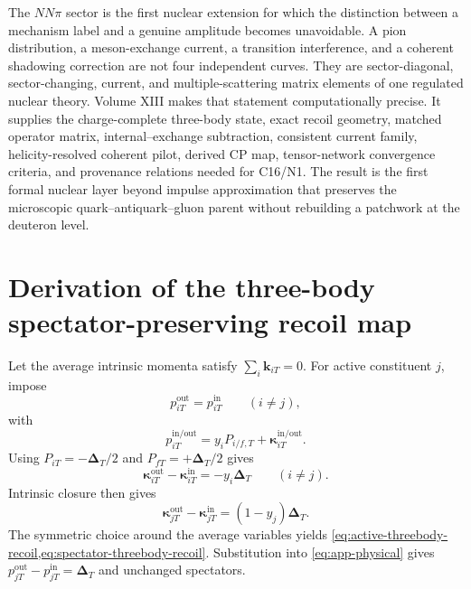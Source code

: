 \documentclass[11pt]{article}
\newcommand{\DT}{\bm{\Delta}_{T}}
\begin{document}
The \(NN\pi\) sector is the first nuclear extension for which the distinction
between a mechanism label and a genuine amplitude becomes unavoidable.  A
pion distribution, a meson-exchange current, a transition interference, and a
coherent shadowing correction are not four independent curves.  They are
sector-diagonal, sector-changing, current, and multiple-scattering matrix
elements of one regulated nuclear theory.  Volume XIII makes that statement
computationally precise.  It supplies the charge-complete three-body state,
exact recoil geometry, matched operator matrix, internal--exchange
subtraction, consistent current family, helicity-resolved coherent pilot,
derived CP map, tensor-network convergence criteria, and provenance relations
needed for C16/N1.  The result is the first formal nuclear layer beyond
impulse approximation that preserves the microscopic quark--antiquark--gluon
parent without rebuilding a patchwork at the deuteron level.

\appendix

\section{Derivation of the three-body spectator-preserving recoil map}
\label{app:recoil}

Let the average intrinsic momenta satisfy
\(
\sum_i\bm k_{iT}=0
\).
For active constituent \(j\), impose
\begin{equation}
 p_{iT}^{\mathrm{out}}=p_{iT}^{\mathrm{in}}
 \qquad(i\neq j),
 \label{eq:app-spectator}
\end{equation}
with
\begin{equation}
 p_{iT}^{\mathrm{in/out}}
 =y_iP_{i/f,T}+\bm\kappa_{iT}^{\mathrm{in/out}}.
 \label{eq:app-physical}
\end{equation}
Using \(P_{iT}=-\DT/2\) and \(P_{fT}=+\DT/2\) gives
\begin{equation}
 \bm\kappa_{iT}^{\mathrm{out}}
 -\bm\kappa_{iT}^{\mathrm{in}}
 =-y_i\DT
 \qquad(i\neq j).
 \label{eq:app-spectator-shift}
\end{equation}
Intrinsic closure then gives
\begin{equation}
 \bm\kappa_{jT}^{\mathrm{out}}
 -\bm\kappa_{jT}^{\mathrm{in}}
 =(1-y_j)\DT.
 \label{eq:app-active-shift}
\end{equation}
The symmetric choice around the average variables yields
\cref{eq:active-threebody-recoil,eq:spectator-threebody-recoil}.  Substitution
into \cref{eq:app-physical} gives
\(
 p_{jT}^{\mathrm{out}}-p_{jT}^{\mathrm{in}}=\DT
\)
and unchanged spectators.
\end{document}
